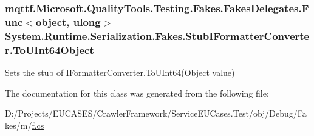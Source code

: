 \hypertarget{class_system_1_1_runtime_1_1_serialization_1_1_fakes_1_1_stub_i_formatter_converter_a19bcf13606d8e53159e826c8cb2dba10}{
\subsubsection[{To\-U\-Int64\-Object}]{\setlength{\rightskip}{0pt plus 5cm}mqttf.\-Microsoft.\-Quality\-Tools.\-Testing.\-Fakes.\-Fakes\-Delegates.\-Func$<$object, ulong$>$ System.\-Runtime.\-Serialization.\-Fakes.\-Stub\-I\-Formatter\-Converter.\-To\-U\-Int64\-Object}}\label{class_system_1_1_runtime_1_1_serialization_1_1_fakes_1_1_stub_i_formatter_converter_a19bcf13606d8e53159e826c8cb2dba10}


Sets the stub of I\-Formatter\-Converter.\-To\-U\-Int64(\-Object value)



The documentation for this class was generated from the following file\-:\begin{DoxyCompactItemize}
\item 
D\-:/\-Projects/\-E\-U\-C\-A\-S\-E\-S/\-Crawler\-Framework/\-Service\-E\-U\-Cases.\-Test/obj/\-Debug/\-Fakes/m/\hyperlink{m_2f_8cs}{f.\-cs}\end{DoxyCompactItemize}
